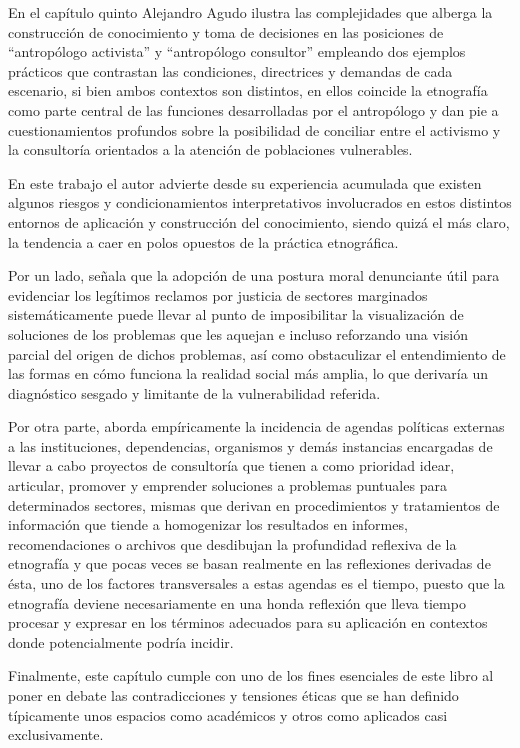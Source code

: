 \documentclass[
  spanish,
  11pt,
  a4paper,
]{scrbook}
\begin{document}
\vspace*{.75cm}

En el capítulo quinto Alejandro Agudo ilustra las complejidades que
alberga la construcción de conocimiento y toma de decisiones en las
posiciones de ``antropólogo activista'' y ``antropólogo consultor''
empleando dos ejemplos prácticos que contrastan las condiciones,
directrices y demandas de cada escenario, si bien ambos contextos son
distintos, en ellos coincide la etnografía como parte central de las
funciones desarrolladas por el antropólogo y dan pie a cuestionamientos
profundos sobre la posibilidad de conciliar entre el activismo y la
consultoría orientados a la atención de poblaciones vulnerables.

En este trabajo el autor advierte desde su experiencia acumulada que
existen algunos riesgos y condicionamientos interpretativos involucrados
en estos distintos entornos de aplicación y construcción del
conocimiento, siendo quizá el más claro, la tendencia a caer en polos
opuestos de la práctica etnográfica.

Por un lado, señala que la adopción de una postura moral denunciante
útil para evidenciar los legítimos reclamos por justicia de sectores
marginados sistemáticamente puede llevar al punto de imposibilitar la
visualización de soluciones de los problemas que les aquejan e incluso
reforzando una visión parcial del origen de dichos problemas, así como
obstaculizar el entendimiento de las formas en cómo funciona la realidad
social más amplia, lo que derivaría un diagnóstico sesgado y limitante
de la vulnerabilidad referida.

Por otra parte, aborda empíricamente la incidencia de agendas políticas
externas a las instituciones, dependencias, organismos y demás
instancias encargadas de llevar a cabo proyectos de consultoría que
tienen a como prioridad idear, articular, promover y emprender
soluciones a problemas puntuales para determinados sectores, mismas que
derivan en procedimientos y tratamientos de información que tiende a
homogenizar los resultados en informes, recomendaciones o archivos que
desdibujan la profundidad reflexiva de la etnografía y que pocas veces
se basan realmente en las reflexiones derivadas de ésta, uno de los
factores transversales a estas agendas es el tiempo, puesto que la
etnografía deviene necesariamente en una honda reflexión que lleva
tiempo procesar y expresar en los términos adecuados para su aplicación
en contextos donde potencialmente podría incidir.

Finalmente, este capítulo cumple con uno de los fines esenciales de este
libro al poner en debate las contradicciones y tensiones éticas que se
han definido típicamente unos espacios como académicos y otros como
aplicados casi exclusivamente.
\end{document}
